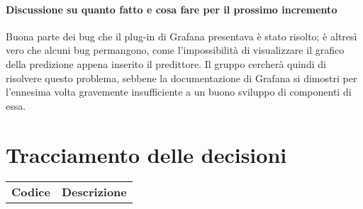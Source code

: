 \documentclass{article}
\begin{document}
\paragraph*{Discussione su quanto fatto e cosa fare per il prossimo incremento}
Buona parte dei bug che il plug-in di Grafana presentava è stato risolto; è altresì vero che alcuni bug permangono, come l'impossibilità di visualizzare il grafico 
della predizione appena inserito il predittore. Il gruppo cercherà quindi di risolvere questo problema, sebbene la documentazione di Grafana si dimostri 
per l'ennesima volta gravemente insufficiente a un buono sviluppo di componenti di essa.

\section{Tracciamento delle decisioni}
\begin{table}[H]
  \centering
  \begin{tabular}{p{4cm}|p{12cm}}
    \rowcolor{lightgray}
    \textbf{Codice}  & \textbf{Descrizione}      \\
  \end{tabular}
\end{table}
\end{document}
